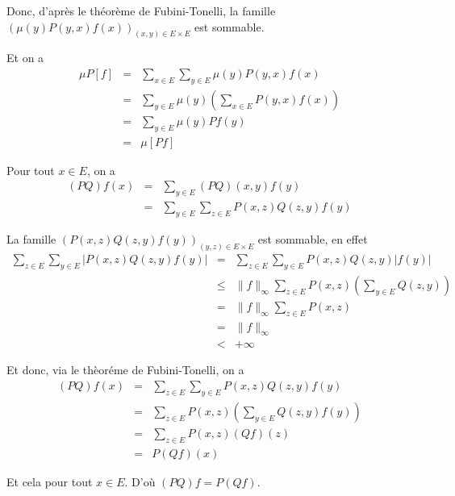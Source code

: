 Donc, d'apr{\`e}s le th{\'e}or{\`e}me de Fubini-Tonelli, la famille $(\mu (y)
P (y, x) f (x))_{(x, y) \in E \times E}$ est sommable.

Et on a
\begin{eqnarray*}
  \mu P [f] & = & \underset{x \in E}{\sum} \underset{y \in E}{\sum} \mu (y) P
  (y, x) f (x)\\
  & = & \underset{y \in E}{\sum} \mu (y) \left( \underset{x \in E}{\sum} P
  (y, x) f (x) \right)\\
  & = & \underset{y \in E}{\sum} \mu (y) P f (y)\\
  & = & \mu [P f]
\end{eqnarray*}



Pour tout $x \in E$, on a
\begin{eqnarray*}
  (P Q) f (x) & = & \underset{y \in E}{\sum} (P Q) (x, y) f (y)\\
  & = & \underset{y \in E}{\sum} \underset{z \in E}{\sum} P (x, z) Q (z, y) f
  (y)
\end{eqnarray*}


La famille $(P (x, z) Q (z, y) f (y))_{(y, z) \in E \times E}$ est sommable,
en effet
\begin{eqnarray*}
  \underset{z \in E}{\sum} \underset{y \in E}{\sum} | P (x, z) Q (z, y) f (y)
  | & = & \underset{z \in E}{\sum} \underset{y \in E}{\sum} P (x, z) Q (z, y)
  | f (y) |\\
  & \leqslant & \| f \|_{\infty} \underset{z \in E}{\sum} P (x, z) \left(
  \underset{y \in E}{\sum} Q (z, y) \right)\\
  & = & \| f \|_{\infty} \underset{z \in E}{\sum} P (x, z)\\
  & = & \| f \|_{\infty}\\
  & < & + \infty
\end{eqnarray*}


Et donc, via le th{\`e}or{\'e}me de Fubini-Tonelli, on a
\begin{eqnarray*}
  (P Q) f (x) & = & \underset{z \in E}{\sum} \underset{y \in E}{\sum} P (x, z)
  Q (z, y) f (y)\\
  & = & \underset{z \in E}{\sum} P (x, z) \left( \underset{y \in E}{\sum} Q
  (z, y) f (y) \right)\\
  & = & \underset{z \in E}{\sum} P (x, z) (Q f) (z)\\
  & = & P (Q f) (x)
\end{eqnarray*}


Et cela pour tout $x \in E$. D'o{\`u} $(P Q) f = P (Q f)$.

